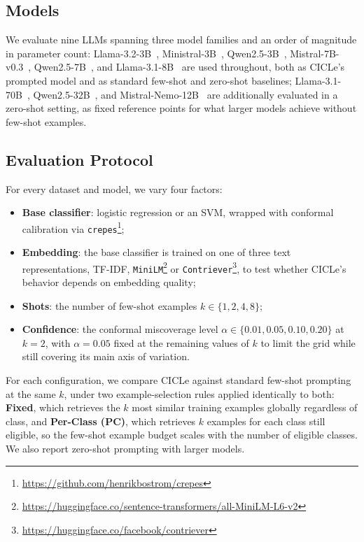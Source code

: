 \documentclass[runningheads]{llncs}
\begin{document}
%
\subsection{Models}
%
We evaluate nine LLMs spanning three model families and an order of
magnitude in parameter count: Llama-3.2-3B~\cite{grattafiori2024llama3},
Ministral-3B~\cite{mistralai2024ministral}, Qwen2.5-3B~\cite{qwen2024qwen25},
Mistral-7B-v0.3~\cite{jiang2023mistral7b}, Qwen2.5-7B~\cite{qwen2024qwen25},
and Llama-3.1-8B~\cite{grattafiori2024llama3} are used throughout, both as
CICLe's prompted model and as standard few-shot and zero-shot baselines;
Llama-3.1-70B~\cite{grattafiori2024llama3}, Qwen2.5-32B~\cite{qwen2024qwen25},
and Mistral-Nemo-12B~\cite{mistralai2024nemo} are additionally evaluated
in a zero-shot setting, as fixed reference points for what larger models achieve without few-shot examples.
%
\subsection{Evaluation Protocol}\label{sec:protocol}
%
For every dataset and model, we vary four factors:
%
\begin{itemize}
    \item \textbf{Base classifier}: logistic regression or an SVM,
    wrapped with conformal calibration via
    \texttt{crepes}\footnote{\url{https://github.com/henrikbostrom/crepes}};
    \item \textbf{Embedding}: the base classifier is trained on one of
    three text representations, TF-IDF, \texttt{MiniLM}\footnote{\url{https://huggingface.co/sentence-transformers/all-MiniLM-L6-v2}} or \texttt{Contriever}\footnote{\url{https://huggingface.co/facebook/contriever}}, to test whether CICLe's behavior depends on embedding
    quality;
    \item \textbf{Shots}: the number of few-shot examples $k \in \{1,2,4,8\}$;
    \item \textbf{Confidence}: the conformal miscoverage level
    $\alpha \in \{0.01, 0.05, 0.10, 0.20\}$ at $k{=}2$, with $\alpha{=}0.05$
    fixed at the remaining values of $k$ to limit the grid while still
    covering its main axis of variation.
\end{itemize}
%
For each configuration, we compare CICLe against standard few-shot prompting
at the same $k$, under two example-selection rules applied
identically to both: \textbf{Fixed}, which retrieves the $k$ most similar
training examples globally regardless of class, and \textbf{Per-Class
(PC)}, which retrieves $k$ examples for each class still eligible, so the
few-shot example budget scales with the number of eligible classes. We
also report zero-shot prompting with larger models.
%
\end{document}
